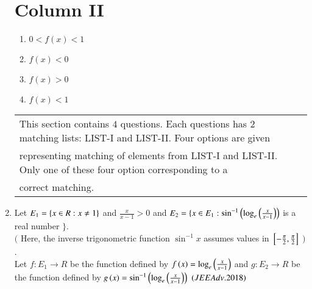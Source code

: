 \documentclass[journal,12pt,twocolumn,article]{IEEEtran}
\theoremstyle{remark}
\begin{document}
\begin{enumerate}
\begin{multicols}{2}
						\section*{ Column II}
						\begin{enumerate}[label=(\alph*) ,start=16]
							\item $0<f(x)<1$
							\item $f(x)<0$
							\item $f(x)>0$
							\item $f(x)<1$
						\end{enumerate}
					\end{multicols}
         \begin{tabular}{l|l}
\\
\hline
This section contains $4$ questions. Each questions has $2$ matching lists: LIST-I and LIST-II. Four options are given\\representing matching of elements from LIST-I and LIST-II. Only one of these four option corresponding to a\\correct matching.
\\
\hline
\end{tabular}
			 \item Let $E_1=\left\{x\in R:x\neq1\right\}$ and $\frac{x}{x-1}>0$ and $E_2=\{x\in E_1:\sin^{-1}\left(\log_e\left(\frac{x}{x-1}\right)\right)$ is a real number $\}$.\\ 
				 $($ Here, the inverse trigonometric function $\sin^{-1}x$ assumes values in ${}\left[-\frac{\pi}{2},\frac{\pi}{2}\right]$ $)$.\\
			Let $f:E_1\to R$ be the function defined by $f\left(x\right)=\log_e\left(\frac{x}{x-1}\right)$ and $g:E_2\to R$ be the function defined by $g\left(x\right)=\sin^{-1}\left(\log_e\left(\frac{x}{x-1}\right)\right)$
			\hfill${\left(JEE Adv.2018\right)}$
                 \end{enumerate}
\end{document}
